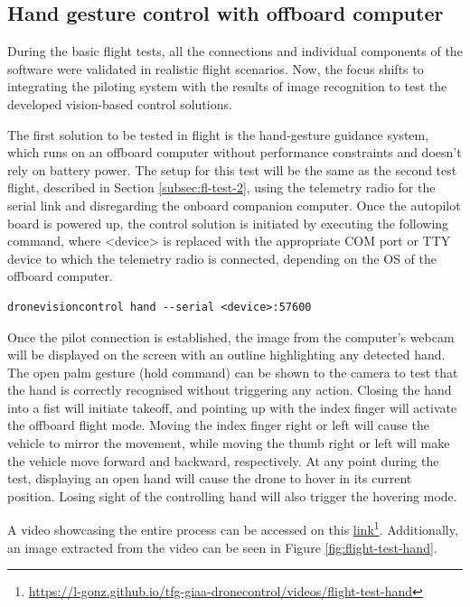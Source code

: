 \subsection{Hand gesture control with offboard computer}
\label{subsec:fl-test-4}


During the basic flight tests, all the connections and individual components of the software were validated in realistic flight scenarios. Now, the focus shifts to integrating the piloting system with the results of image recognition to test the developed vision-based control solutions.

The first solution to be tested in flight is the hand-gesture guidance system, which runs on an offboard computer without performance constraints and doesn't rely on battery power. The setup for this test will be the same as the second test flight, described in Section \ref{subsec:fl-test-2}, using the telemetry radio for the serial link and disregarding the onboard companion computer. Once the autopilot board is powered up, the control solution is initiated by executing the following command, where <device> is replaced with the appropriate COM port or TTY device to which the telemetry radio is connected, depending on the OS of the offboard computer.
\begin{verbatim}
dronevisioncontrol hand --serial <device>:57600
\end{verbatim}


Once the pilot connection is established, the image from the computer's webcam will be displayed on the screen with an outline highlighting any detected hand. The open palm gesture (hold command) can be shown to the camera to test that the hand is correctly recognised without triggering any action. Closing the hand into a fist will initiate takeoff, and pointing up with the index finger will activate the offboard flight mode. Moving the index finger right or left will cause the vehicle to mirror the movement, while moving the thumb right or left will make the vehicle move forward and backward, respectively. At any point during the test, displaying an open hand will cause the drone to hover in its current position. Losing sight of the controlling hand will also trigger the hovering mode.


A video showcasing the entire process can be accessed on this \href{https://l-gonz.github.io/tfg-giaa-dronecontrol/videos/flight-test-hand}{link}\footnote{\url{https://l-gonz.github.io/tfg-giaa-dronecontrol/videos/flight-test-hand}}. Additionally, an image extracted from the video can be seen in Figure \ref{fig:flight-test-hand}.

